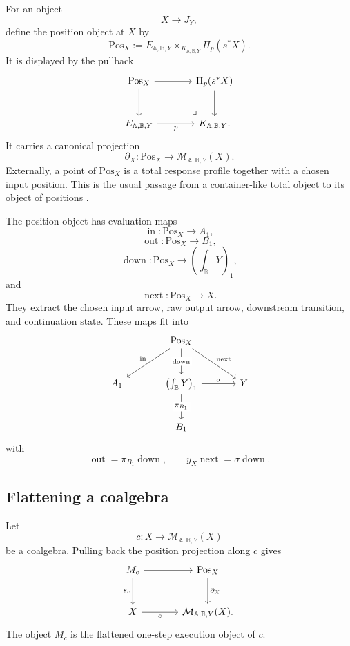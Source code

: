 For an object
\[
X\to J_Y,
\]
define the position object at \(X\) by
\[
\mathrm{Pos}_X
:=
E_{\mathbb A,\mathbb B,Y}
\times_{K_{\mathbb A,\mathbb B,Y}}
\Pi_p(s^\ast X).
\]
It is displayed by the pullback
\[
\begin{tikzcd}[column sep=large,row sep=large]
\mathrm{Pos}_X
  \arrow[r]
  \arrow[d]
&
\Pi_p(s^\ast X)
  \arrow[d]
\\
E_{\mathbb A,\mathbb B,Y}
  \arrow[r,"p"']
&
K_{\mathbb A,\mathbb B,Y}
\arrow[ul,phantom,very near start,"\lrcorner"] .
\end{tikzcd}
\]
It carries a canonical projection
\[
\partial_X:\mathrm{Pos}_X\to
\mathcal M_{\mathbb A,\mathbb B,Y}(X).
\]
Externally, a point of \(\mathrm{Pos}_X\) is a total response profile together
with a chosen input position.  This is the usual passage from a container-like
total object to its object of positions
\cite{AbbottAltenkirchGhani2005Containers}.

The position object has evaluation maps
\[
\operatorname{in}:\mathrm{Pos}_X\to A_1,
\]
\[
\operatorname{out}:\mathrm{Pos}_X\to B_1,
\]
\[
\operatorname{down}:\mathrm{Pos}_X\to
\left(\int_{\mathbb B}Y\right)_1,
\]
and
\[
\operatorname{next}:\mathrm{Pos}_X\to X.
\]
They extract the chosen input arrow, raw output arrow, downstream transition,
and continuation state.  These maps fit into
\[
\begin{tikzcd}[column sep=large,row sep=large]
&
\mathrm{Pos}_X
  \arrow[dl,"\operatorname{in}"']
  \arrow[d,"\operatorname{down}" description]
  \arrow[dr,"\operatorname{next}"]
&
\\
A_1
&
\left(\int_{\mathbb B}Y\right)_1
  \arrow[d,"\pi_{B_1}" description]
  \arrow[r,"\sigma"]
&
Y
\\
&
B_1
&
\end{tikzcd}
\]
with
\[
\operatorname{out}
=
\pi_{B_1}\operatorname{down},
\qquad
y_X\operatorname{next}
=
\sigma\operatorname{down}.
\]

\subsection{Flattening a coalgebra}
\label{subsec:poly-relative-flattening-coalgebra}

Let
\[
c:X\to\mathcal M_{\mathbb A,\mathbb B,Y}(X)
\]
be a coalgebra.  Pulling back the position projection along \(c\) gives
\[
\begin{tikzcd}[column sep=large,row sep=large]
M_c
  \arrow[r]
  \arrow[d,"s_c"']
&
\mathrm{Pos}_X
  \arrow[d,"\partial_X"]
\\
X
  \arrow[r,"c"']
&
\mathcal M_{\mathbb A,\mathbb B,Y}(X)
\arrow[ul,phantom,very near start,"\lrcorner"] .
\end{tikzcd}
\]
The object \(M_c\) is the flattened one-step execution object of \(c\).

